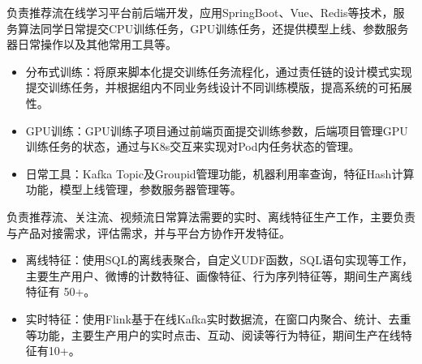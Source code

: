 \documentclass{resume}
\begin{document}
\begin{onehalfspacing}  负责推荐流在线学习平台前后端开发，应用SpringBoot、Vue、Redis等技术，服务算法同学日常提交CPU训练任务，GPU训练任务，还提供模型上线、参数服务器日常操作以及其他常用工具等。
\begin{itemize}
 \item 分布式训练：将原来脚本化提交训练任务流程化，通过责任链的设计模式实现提交训练任务，并根据组内不同业务线设计不同训练模版，提高系统的可拓展性。
 \item GPU训练：GPU训练子项目通过前端页面提交训练参数，后端项目管理GPU训练任务的状态，通过与K8s交互来实现对Pod内任务状态的管理。
 \item 日常工具：Kafka Topic及Groupid管理功能，机器利用率查询，特征Hash计算功能，模型上线管理，参数服务器管理等。
\end{itemize}
\end{onehalfspacing}

\begin{onehalfspacing}  负责推荐流、关注流、视频流日常算法需要的实时、离线特征生产工作，主要负责与产品对接需求，评估需求，并与平台方协作开发特征。
\begin{itemize}
 \item 离线特征：使用SQL的离线表聚合，自定义UDF函数，SQL语句实现等工作，主要生产用户、微博的计数特征、画像特征、行为序列特征等，期间生产离线特征有 50+。
 \item 实时特征：使用Flink基于在线Kafka实时数据流，在窗口内聚合、统计、去重等功能，主要生产用户的实时点击、互动、阅读等行为特征，期间生产在线特征有10+。
 \end{itemize}
\end{onehalfspacing}



\end{document}
